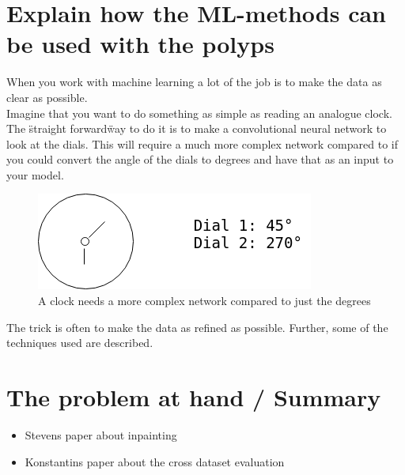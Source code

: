     



        
      
\section{Explain how the ML-methods can be used with the polyps}
    When you work with machine learning a lot of the job is to make the data as clear as possible. \\
    Imagine that you want to do something as simple as reading an analogue clock. The \"straight forward\" way to do it is to make a convolutional neural network to look at the dials. This will require a much more complex network compared to if you could convert the angle of the dials to degrees and have that as an input to your model.

    \begin{figure}[ht]
      \centering
      \includegraphics[scale=0.5]{methods/figures/Clock.png}
      \caption{A clock needs a more complex network compared to just the degrees}
    \end{figure}
    The trick is often to make the data as refined as possible. 
    Further, some of the techniques used are described.
    
    
    
      
      
\section{The problem at hand / Summary}
\begin{itemize}
	\item Stevens paper about inpainting
	\item Konstantins paper about the cross dataset evaluation
\end{itemize}



